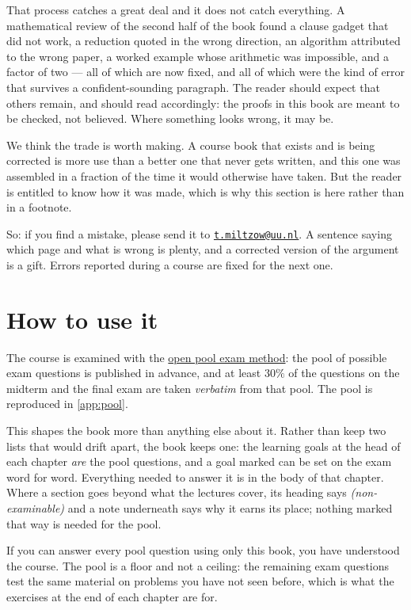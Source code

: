 That process catches a great deal and it does not catch everything. A
mathematical review of the second half of the book found a clause gadget that
did not work, a reduction quoted in the wrong direction, an algorithm
attributed to the wrong paper, a worked example whose arithmetic was impossible,
and a factor of two --- all of which are now fixed, and all of which were the
kind of error that survives a confident-sounding paragraph. The reader should
expect that others remain, and should read accordingly: the proofs in this book
are meant to be checked, not believed. Where something looks wrong, it may
be.

We think the trade is worth making. A course book that exists and is being
corrected is more use than a better one that never gets written, and this one
was assembled in a fraction of the time it would otherwise have taken. But the
reader is entitled to know how it was made, which is why this section is here
rather than in a footnote.

So: if you find a mistake, please send it to
\href{mailto:t.miltzow@uu.nl}{\texttt{t.miltzow@uu.nl}}. A sentence saying
which page and what is wrong is plenty, and a corrected version of the argument
is a gift. Errors reported during a course are fixed for the next one.

\section*{How to use it}

The course is examined with the
\href{https://openpoolexams.science.uu.nl/}{open pool exam method}: the pool of
possible exam questions is published in advance, and at least $30\%$ of the
questions on the midterm and the final exam are taken \emph{verbatim} from that
pool. The pool is reproduced in \cref{app:pool}.

This shapes the book more than anything else about it. Rather than keep two
lists that would drift apart, the book keeps one: the learning goals at the head
of each chapter \emph{are} the pool questions, and a goal marked \pooltag{} can
be set on the exam word for word. Everything needed to answer it is in the body
of that chapter. Where a section goes beyond what the lectures cover, its
heading says \emph{(non-examinable)} and a note underneath says why it earns its
place; nothing marked that way is needed for the pool.

If you can answer every pool question using only this book, you have understood
the course. The pool is a floor and not a ceiling: the remaining exam questions
test the same material on problems you have not seen before, which is what the
exercises at the end of each chapter are for.

